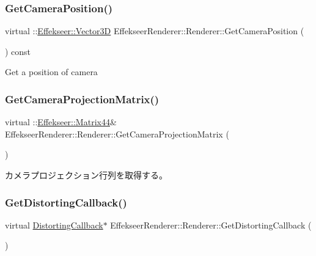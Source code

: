 \subsubsection{\texorpdfstring{Get\+Camera\+Position()}{GetCameraPosition()}}
{\footnotesize\ttfamily virtual \+::\mbox{\hyperlink{struct_effekseer_1_1_vector3_d}{Effekseer\+::\+Vector3D}} Effekseer\+Renderer\+::\+Renderer\+::\+Get\+Camera\+Position (\begin{DoxyParamCaption}{ }\end{DoxyParamCaption}) const\hspace{0.3cm}{\ttfamily [pure virtual]}}



Get a position of camera 

\mbox{\label{class_effekseer_renderer_1_1_renderer_a62e05934631fa04e75ffb87952200042}} 
\subsubsection{\texorpdfstring{Get\+Camera\+Projection\+Matrix()}{GetCameraProjectionMatrix()}}
{\footnotesize\ttfamily virtual \+::\mbox{\hyperlink{struct_effekseer_1_1_matrix44}{Effekseer\+::\+Matrix44}}\& Effekseer\+Renderer\+::\+Renderer\+::\+Get\+Camera\+Projection\+Matrix (\begin{DoxyParamCaption}{ }\end{DoxyParamCaption})\hspace{0.3cm}{\ttfamily [pure virtual]}}



カメラプロジェクション行列を取得する。 

\mbox{\label{class_effekseer_renderer_1_1_renderer_af4db92a0262062bfcc8f3f2334e5a168}} 
\subsubsection{\texorpdfstring{Get\+Distorting\+Callback()}{GetDistortingCallback()}}
{\footnotesize\ttfamily virtual \mbox{\hyperlink{class_effekseer_renderer_1_1_distorting_callback}{Distorting\+Callback}}$\ast$ Effekseer\+Renderer\+::\+Renderer\+::\+Get\+Distorting\+Callback (\begin{DoxyParamCaption}{ }\end{DoxyParamCaption})\hspace{0.3cm}{\ttfamily [pure virtual]}}



